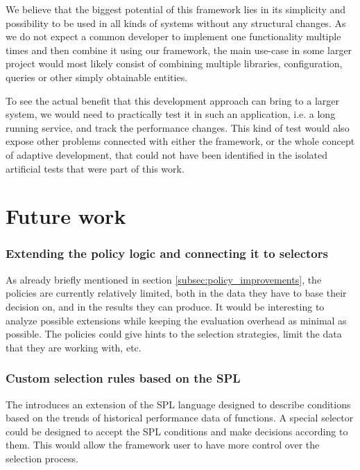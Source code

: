 We believe that the biggest potential of this framework lies in its simplicity and possibility to be used in all kinds of systems without any structural changes. As we do not expect a common developer to implement one functionality multiple times and then combine it using our framework, the main use-case in some larger project would most likely consist of combining multiple libraries, configuration, queries or other simply obtainable entities.

To see the actual benefit that this development approach can bring to a larger system, we would need to practically test it in such an application, i.e. a long running service, and track the performance changes. This kind of test would also expose other problems connected with either the framework, or the whole concept of adaptive development, that could not have been identified in the isolated artificial tests that were part of this work.


\section*{Future work}

\subsubsection{Extending the policy logic and connecting it to selectors}

As already briefly mentioned in section \ref{subsec:policy_improvements}, the policies are currently relatively limited, both in the data they have to base their decision on, and in the results they can produce. It would be interesting to analyze possible extensions while keeping the evaluation overhead as minimal as possible. The policies could give hints to the selection strategies, limit the data that they are working with, etc.

\subsubsection{Custom selection rules based on the SPL}

The \cite{bulej_performance_2012} introduces an extension of the SPL language designed to describe conditions based on the trends of historical performance data of functions. A special selector could be designed to accept the SPL conditions and make decisions according to them. This would allow the framework user to have more control over the selection process. 

